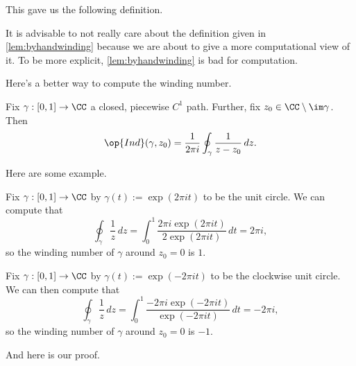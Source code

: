 This gave us the following definition.
\windingnumberdef*
\begin{remark}
	It is advisable to not really care about the definition given in \autoref{lem:byhandwinding} because we are about to give a more computational view of it. To be more explicit, \autoref{lem:byhandwinding} is bad for computation.
\end{remark}
Here's a better way to compute the winding number.
\begin{lemma} \label{lem:betterwinding}
	Fix $\gamma:[0,1]\to\CC$ a closed, piecewise $C^1$ path. Further, fix $z_0\in\CC\setminus\im\gamma$. Then
	\[\op{Ind}(\gamma,z_0)=\frac1{2\pi i}\oint_\gamma\frac1{z-z_0}\,dz.\]
\end{lemma}
Here are some example.
\begin{example}
	Fix $\gamma:[0,1]\to\CC$ by $\gamma(t):=\exp(2\pi it)$ to be the unit circle. We can compute that
	\[\oint_\gamma\frac1z\,dz=\int_0^1\frac{2\pi i\exp(2\pi it)}{2\exp(2\pi it)}\,dt=2\pi i,\]
	so the winding number of $\gamma$ around $z_0=0$ is $1$.
\end{example}
\begin{example}
	Fix $\gamma:[0,1]\to\CC$ by $\gamma(t):=\exp(-2\pi it)$ to be the clockwise unit circle. We can then compute that
	\[\oint_\gamma\frac1z\,dz=\int_0^1\frac{-2\pi i\exp(-2\pi it)}{\exp(-2\pi it)}\,dt=-2\pi i,\]
	so the winding number of $\gamma$ around $z_0=0$ is $-1$.
\end{example}
And here is our proof.
